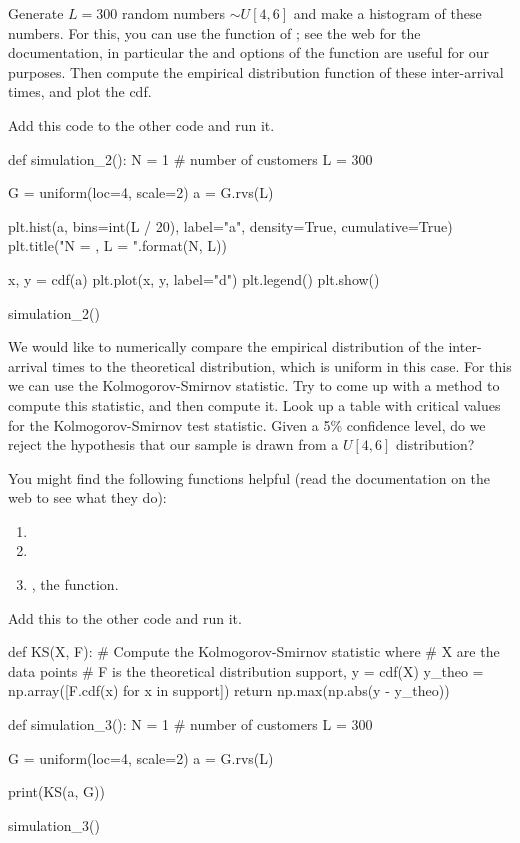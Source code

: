 \begin{exercise}
  Generate $L=300$ random numbers $\sim U[4,6]$ and make a histogram of these numbers.
  For this, you can use the  function of ; see the web for the documentation, in particular the  and  options of the  function are useful for our purposes.
  Then compute the empirical distribution function of these inter-arrival times, and plot the cdf.
\begin{solution}
Add this code to the other code and run it.
\begin{pyverbatim}
def simulation_2():
    N = 1  # number of customers
    L = 300

    G = uniform(loc=4, scale=2)
    a = G.rvs(L)

    plt.hist(a, bins=int(L / 20), label="a", density=True, cumulative=True)
    plt.title("N = {}, L = {}".format(N, L))

    x, y = cdf(a)
    plt.plot(x, y, label="d")
    plt.legend()
    plt.show()


simulation_2()
\end{pyverbatim}
\end{solution}
\end{exercise}

\begin{exercise}
We would like to numerically compare the empirical distribution of the inter-arrival times to the theoretical distribution, which is uniform in this case.
For this we can use the Kolmogorov-Smirnov statistic. Try to come up with a method to compute this statistic, and then compute it.
Look up a table with critical values for the Kolmogorov-Smirnov test statistic.
Given a 5\% confidence level, do we reject the hypothesis that our sample is drawn from a $U[4,6]$ distribution?

You might find the following functions helpful (read the documentation on the web to see what they do):
\begin{enumerate}
\item {}
\item {}
\item {}, the  function.
\end{enumerate}

\begin{solution}
Add this to the other code and run it.
\begin{pyverbatim}
def KS(X, F):
    # Compute the Kolmogorov-Smirnov statistic where
    # X are the data points
    # F is the theoretical distribution
    support, y = cdf(X)
    y_theo = np.array([F.cdf(x) for x in support])
    return np.max(np.abs(y - y_theo))


def simulation_3():
    N = 1  # number of customers
    L = 300

    G = uniform(loc=4, scale=2)
    a = G.rvs(L)

    print(KS(a, G))


simulation_3()
\end{pyverbatim}
\end{solution}
\end{exercise}

